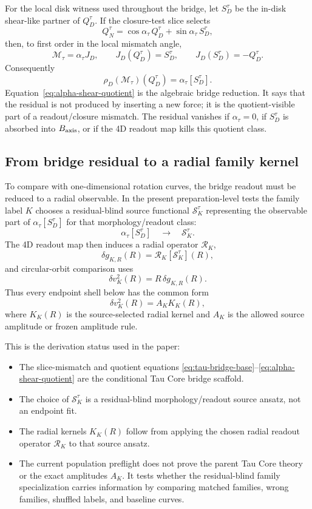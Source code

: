 \documentclass[11pt]{article}
\begin{document}
For the local disk witness used throughout the bridge, let \(S_D^\tau\) be the
in-disk shear-like partner of \(Q_D^\tau\).  If the closure-test slice selects
\[
Q_N^\tau
=
\cos\alpha_\tau\,Q_D^\tau
+
\sin\alpha_\tau\,S_D^\tau ,
\]
then, to first order in the local mismatch angle,
\[
\mathcal M_\tau=\alpha_\tau J_D,
\qquad
J_D(Q_D^\tau)=S_D^\tau,
\qquad
J_D(S_D^\tau)=-Q_D^\tau .
\]
Consequently
\begin{equation}
\rho_D(\mathcal M_\tau)(Q_D^\tau)
=
\alpha_\tau [S_D^\tau].
\label{eq:alpha-shear-quotient}
\end{equation}
Equation~\eqref{eq:alpha-shear-quotient} is the algebraic bridge reduction.
It says that the residual is not produced by inserting a new force; it is the
quotient-visible part of a readout/closure mismatch.  The residual vanishes if
\(\alpha_\tau=0\), if \(S_D^\tau\) is absorbed into \(B_{\rm axis}\), or if the
4D readout map kills this quotient class.

\subsection{From bridge residual to a radial family kernel}

To compare with one-dimensional rotation curves, the bridge readout must be
reduced to a radial observable.  In the present preparation-level tests the
family label \(K\) chooses a residual-blind source functional
\(\mathcal S_K^\tau\) representing the observable part of
\(\alpha_\tau[S_D^\tau]\) for that morphology/readout class:
\[
\alpha_\tau [S_D^\tau]
\quad\longrightarrow\quad
\mathcal S_K^\tau .
\]
The 4D readout map then induces a radial operator \(\mathcal R_K\),
\[
\delta g_{K,R}(R)
=
\mathcal R_K[\mathcal S_K^\tau](R),
\]
and circular-orbit comparison uses
\begin{equation}
\delta v_K^2(R)=R\,\delta g_{K,R}(R).
\label{eq:radial-velocity-reduction}
\end{equation}
Thus every endpoint shell below has the common form
\[
\delta v_K^2(R)=A_K K_K(R),
\]
where \(K_K(R)\) is the source-selected radial kernel and \(A_K\) is the
allowed source amplitude or frozen amplitude rule.

This is the derivation status used in the paper:
\begin{itemize}[leftmargin=*]
\item The slice-mismatch and quotient equations
\eqref{eq:tau-bridge-base}--\eqref{eq:alpha-shear-quotient} are the
conditional Tau Core bridge scaffold.
\item The choice of \(\mathcal S_K^\tau\) is a residual-blind morphology/readout
source ansatz, not an endpoint fit.
\item The radial kernels \(K_K(R)\) follow from applying the chosen radial
readout operator \(\mathcal R_K\) to that source ansatz.
\item The current population preflight does not prove the parent Tau Core
theory or the exact amplitudes \(A_K\).  It tests whether the residual-blind
family specialization carries information by comparing matched families,
wrong families, shuffled labels, and baseline curves.
\end{itemize}
\end{document}
